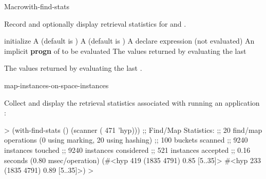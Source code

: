 \documentclass[10pt,twoside,english,pdftex]{article}
\begin{document}

\begin{functiondoc}{Macro}{with-find-stats}%
  {\code{(} \code{)}
    \superstar{}
    \superstar{} 
    \returns{} \superstar}
%
%
%
%
  
\fnsyntax

\fnpurpose 
{}%
%
Record and optionally display retrieval statistics for 
\textbf{} and
\textbf{}.

\fnpackage {}

\fnmodule {}

\fnargs
\begin{args}{initialize}
\arg[initialize] A (default is )
\arg[report] A (default is )
\arg[declaration] A declare expression (not evaluated)
\arg[forms] An implicit \textbf{progn} of  to be evaluated
\arg[results] The values returned by evaluating the last 
\end{args}

\fnreturns The values returned by evaluating the last .

\begin{alsos}{map-instances-on-space-instances}
\end{alsos}

\fnexample
{}%
Collect and display the retrieval statistics associated with
running an application  :
%
\W\supp
\begin{example}
  > (with-find-stats ()
       (scanner ( 471 'hyp)))
  ;; Find/Map Statistics:
  ;;        20 find/map operations (0 using marking, 20 using hashing)
  ;;       100 buckets scanned
  ;;      9240 instances touched
  ;;      9240 instances considered
  ;;       521 instances accepted
  ;;      0.16 seconds (0.80 msec/operation)
  (#<hyp 419 (1835 4791) 0.85 [5..35]>
   #<hyp 233 (1835 4791) 0.89 [5..35]>)
  >
\end{example}

\end{functiondoc}
\end{document}
